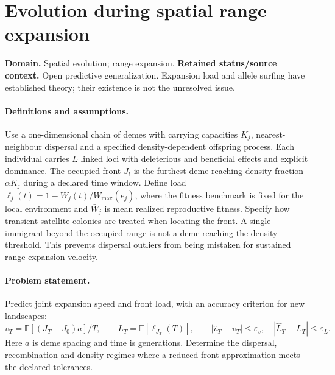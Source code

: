 \documentclass[11pt]{article}
\begin{document}
\section*{Evolution during spatial range expansion}
\label{prob:175}
\label{rank:164}
\par\smallskip

\noindent\textbf{Domain.} Spatial evolution; range expansion. \quad \textbf{Retained status/source context.} Open predictive generalization. Expansion load and allele surfing have established theory; their existence is not the unresolved issue.
\paragraph{Definitions and assumptions.} Use a one-dimensional chain of demes with carrying capacities $K_j$, nearest-neighbour dispersal and a specified density-dependent offspring process. Each individual carries $L$ linked loci with deleterious and beneficial effects and explicit dominance. The occupied front $J_t$ is the furthest deme reaching density fraction $\alpha K_j$ during a declared time window. Define load $\ell_j(t)=1-\bar W_j(t)/W_{\max}(e_j)$, where the fitness benchmark is fixed for the local environment and $\bar W_j$ is mean realized reproductive fitness. Specify how transient satellite colonies are treated when locating the front. A single immigrant beyond the occupied range is not a deme reaching the density threshold. This prevents dispersal outliers from being mistaken for sustained range-expansion velocity.
\paragraph{Problem statement.} Predict joint expansion speed and front load, with an accuracy criterion for new landscapes:
\[
 v_T=\mathbb{E}[(J_T-J_0)a]/T,\qquad
 L_T=\mathbb{E}[\ell_{J_T}(T)],\qquad
 |\widehat v_T-v_T|\le\varepsilon_v,
 \quad |\widehat L_T-L_T|\le\varepsilon_L.
\]
Here $a$ is deme spacing and time is generations. Determine the dispersal, recombination and density regimes where a reduced front approximation meets the declared tolerances.
\end{document}
